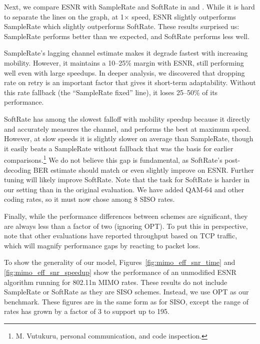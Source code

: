 Next, we compare ESNR with SampleRate and SoftRate %
in  and . While it is hard to separate the lines on the graph, at 1$\times$ speed, ESNR slightly outperforms SampleRate which slightly outperforms SoftRate. These results surprised us: SampleRate performs better than we expected, and SoftRate performs less well.

SampleRate's lagging channel estimate makes it degrade fastest with increasing mobility. However, it maintains a 10--25\% margin with ESNR, still performing well even with large speedups. In deeper analysis, we discovered that dropping rate on retry is an important factor that gives it short-term adaptability. Without this rate fallback (the ``SampleRate fixed'' line), it loses 25--50\% of its performance.

SoftRate has among the slowest falloff with mobility speedup because it directly and accurately measures the channel, and performs the best at maximum speed. However, at slow speeds it is slightly slower on average than SampleRate, though it easily beats a SampleRate without fallback that was the basis for earlier comparisons.\footnote{M. Vutukuru, personal communication, and code inspection.}
We do not believe this gap is fundamental, as SoftRate's post-decoding BER estimate should match or even slightly improve on ESNR\@. Further tuning will likely improve SoftRate. Note that the task for SoftRate is harder in our setting than in the original evaluation. We have added QAM-64 and other coding rates, so it must now chose among 8 SISO rates.

Finally, while the performance differences between schemes are significant, they are always less than a factor of two (ignoring OPT). To put this in perspective, note that other evaluations have reported throughput based on TCP traffic, which will magnify performance gaps by reacting to packet loss.

To show the generality of our model, Figures~\ref{fig:mimo_eff_snr_time} and \ref{fig:mimo_eff_snr_speedup} show the performance of an unmodified ESNR algorithm running for 802.11n MIMO rates. These results do not include SampleRate or SoftRate as they are SISO schemes. Instead, we use OPT as our benchmark.
These figures are in the same form as for SISO, except the range of rates has grown by a factor of 3 to support up to 195\Mbps. 


